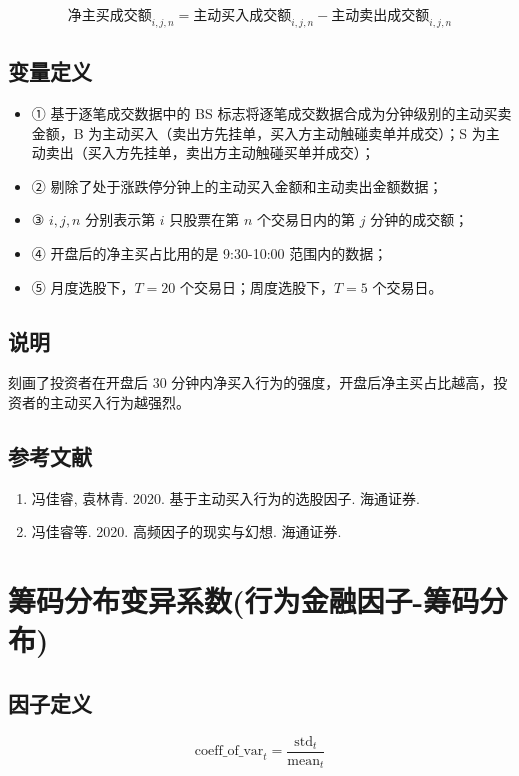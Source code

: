 \documentclass{article}
\begin{document}
\begin{equation}
    \text{净主买成交额}_{i,j,n} = \text{主动买入成交额}_{i,j,n} - \text{主动卖出成交额}_{i,j,n}
\end{equation}

\subsection{变量定义}
\begin{itemize}
    \item ① 基于逐笔成交数据中的 BS 标志将逐笔成交数据合成为分钟级别的主动买卖金额，B 为主动买入（卖出方先挂单，买入方主动触碰卖单并成交）；S 为主动卖出（买入方先挂单，卖出方主动触碰买单并成交）；
    \item ② 剔除了处于涨跌停分钟上的主动买入金额和主动卖出金额数据；
    \item ③ \( i, j, n \) 分别表示第 \( i \) 只股票在第 \( n \) 个交易日内的第 \( j \) 分钟的成交额；
    \item ④ 开盘后的净主买占比用的是 9:30-10:00 范围内的数据；
    \item ⑤ 月度选股下，\( T=20 \) 个交易日；周度选股下，\( T=5 \) 个交易日。
\end{itemize}

\subsection{说明}
刻画了投资者在开盘后 30 分钟内净买入行为的强度，开盘后净主买占比越高，投资者的主动买入行为越强烈。

\subsection{参考文献}
\begin{enumerate}
    \item 冯佳睿, 袁林青. 2020. 基于主动买入行为的选股因子. 海通证券.
    \item 冯佳睿等. 2020. 高频因子的现实与幻想. 海通证券.
\end{enumerate}

\section{筹码分布变异系数(行为金融因子-筹码分布)}

\subsection{因子定义}
\begin{equation}
    \mathrm{coeff\_of\_var}_t = \frac{\mathrm{std}_t}{\mathrm{mean}_t}
\end{equation}
\end{document}

